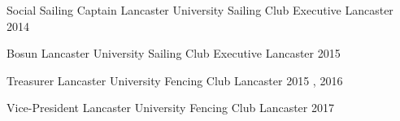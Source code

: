 

\begin{cvhonors}

  \cvhonor
    {Social Sailing Captain} %
    {Lancaster University Sailing Club Executive} %
    {Lancaster} %
    {2014} %

  \cvhonor
    {Bosun} %
    {Lancaster University Sailing Club Executive} %
    {Lancaster} %
    {2015} %

  \cvhonor
    {Treasurer} %
    {Lancaster University Fencing Club} %
    {Lancaster} %
    {2015 , 2016} %

  \cvhonor
    {Vice-President} %
    {Lancaster University Fencing Club} %
    {Lancaster} %
    {2017} %

\end{cvhonors}
